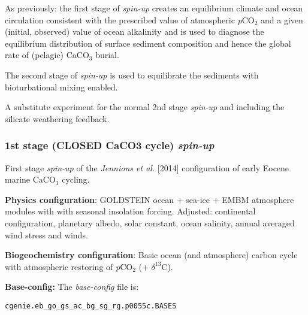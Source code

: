 \documentclass[10pt,twoside]{article}
\begin{document}
        \begin{compactenum}
        
                \item As previously: the first stage of \textit{spin-up} creates an equilibrium climate and ocean circulation consistent with the prescribed value of atmospheric \textit{p}CO$_{2}$ and a given (initial, observed) value of ocean alkalinity and is used to diagnose the equilibrium distribution of surface sediment composition and hence the global rate of (pelagic) CaCO$_{3}$ burial.
                
                \item The second stage of \textit{spin-up} is used to equilibrate the sediments with bioturbational mixing enabled. 
                
                \item A substitute experiment for the normal 2nd stage \textit{spin-up} and including the silicate weathering feedback.
                
        \end{compactenum}


\subsubsection{1st stage (CLOSED CaCO3 cycle) \textit{spin-up}}\label{EXAMPLE.p0055c.Jennionsetal2014.SPIN1}

First stage \textsl{spin-up} of the \textit{Jennions et al.} [2014] configuration of early Eocene marine CaCO$_{3}$ cycling.

\noindent \textbf{Physics configuration}: GOLDSTEIN ocean + sea-ice + EMBM atmosphere modules with with seasonal insolation forcing. Adjusted: continental configuration, planetary albedo, solar constant, ocean salinity, annual averaged wind stress and winds.

\noindent \textbf{Biogeochemistry configuration}: Basic ocean (and atmosphere) carbon cycle with atmospheric restoring of \textit{p}CO$_{2}$ (+ $\delta^{13}$C).

\noindent \textbf{Base-config:} The \textit{base-config} file is:
\vspace{-10pt}\begin{verbatim}cgenie.eb_go_gs_ac_bg_sg_rg.p0055c.BASES\end{verbatim}\vspace{-10pt}
\end{document}
